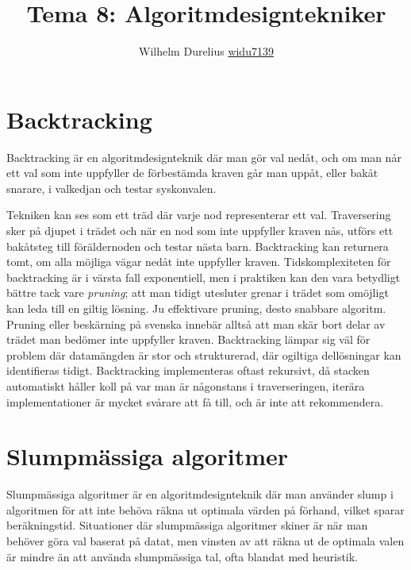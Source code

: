 \documentclass[a5paper,10pt,oneside]{article}
\title{Tema 8: Algoritmdesigntekniker}
\author{Wilhelm Durelius \url{widu7139}}
\begin{document}
\maketitle


\section{Backtracking}
Backtracking är en algoritmdesignteknik där man gör val nedåt, och om man når ett val som inte
uppfyller de förbestämda kraven går man uppåt, eller bakåt snarare, i valkedjan och testar 
syskonvalen. 

Tekniken kan  ses som ett träd där varje nod representerar ett val.
Traversering sker på djupet i trädet och när en nod som inte uppfyller kraven nås,
utförs ett bakåtsteg till föräldernoden och testar nästa barn. Backtracking kan returnera tomt, om alla möjliga vägar nedåt inte uppfyller kraven.
Tidskomplexiteten för backtracking är i värsta fall exponentiell, 
men i praktiken kan den vara betydligt bättre tack vare \textit{pruning}; att man tidigt utesluter grenar i trädet som omöjligt kan leda till en giltig lösning. Ju effektivare pruning, desto snabbare algoritm.
Pruning eller beskärning på svenska innebär alltså att man skär bort delar av trädet man bedömer inte uppfyller kraven.
Backtracking lämpar sig väl för problem där datamängden är stor och strukturerad, där ogiltiga dellösningar kan identifieras tidigt. 
Backtracking implementeras oftast rekursivt, då stacken automatiskt håller koll på var man är någonstans i 
traverseringen, iterära implementationer är mycket svårare att få till, och är inte att rekommendera.


\section{Slumpmässiga algoritmer}
Slumpmässiga algoritmer är en algoritmdesignteknik där man använder slump i algoritmen för att inte behöva räkna ut optimala värden på förhand, vilket sparar beräkningstid.
Situationer där slumpmässiga algoritmer skiner är när man behöver göra val baserat på datat, men vinsten av att räkna ut de optimala valen är mindre än att använda 
slumpmässiga tal, ofta blandat med heuristik. 
\end{document}
